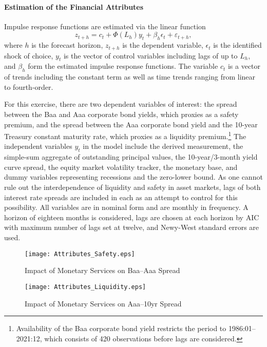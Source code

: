 \documentclass[11pt,a4paper,margin=1.5in]{article}
\begin{document}
\paragraph{Estimation of the Financial Attributes}
Impulse response functions are estimated via the linear function
\begin{equation}
	z_{t+h} = c_t + \Phi(L_h)y_t + \beta_h\epsilon_t + \varepsilon_{t+h},
	\label{eq:Jorda_Model}
\end{equation}
where $h$ is the forecast horizon, $z_{t+h}$ is the dependent variable, $\epsilon_t$ is the identified shock of choice, $y_t$ is the vector of control variables including lags of up to $L_h$, and $\beta_h$ form the estimated impulse response functions.
The variable $c_t$ is a vector of trends including the constant term as well as time trends ranging from linear to fourth-order.

For this exercise, there are two dependent variables of interest: the spread between the Baa and Aaa corporate bond yields, which proxies as a safety premium, and the spread between the Aaa corporate bond yield and the 10-year Treasury constant maturity rate, which proxies as a liquidity premium.\footnote{
	Availability of the Baa corporate bond yield restricts the period to 1986:01--2021:12, which consists of 420 observations before lags are considered.}
The independent variables $y_t$ in the model include the derived measurement, the simple-sum aggregate of outstanding principal values, the 10-year/3-month yield curve spread, the equity market volatility tracker, the monetary base, and dummy variables representing recessions and the zero-lower bound.
As one cannot rule out the interdependence of liquidity and safety in asset markets, lags of both interest rate spreads are included in each as an attempt to control for this possibility.
All variables are in nominal form and are monthly in frequency.
A horizon of eighteen months is considered, lags are chosen at each horizon by AIC with maximum number of lags set at twelve, and Newy-West standard errors are used. 


\begin{figure}[p]
\centering
\texttt{[image: Attributes\_Safety.eps]}
\caption{Impact of Monetary Services on Baa--Aaa Spread}
\label{fig:Attributes_Safety}
\end{figure}
\begin{figure}[p]
\centering
\texttt{[image: Attributes\_Liquidity.eps]}
\caption{Impact of Monetary Services on Aaa--10yr Spread}
\label{fig:Attributes_Liquidity}
\end{figure}
\end{document}
